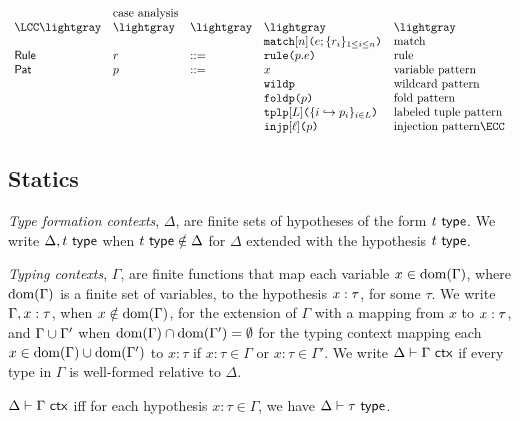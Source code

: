 \[\begin{array}{lllllll}
& \text{case analysis}\\
\LCC \lightgray & \lightgray & \lightgray 
& \lightgray & \lightgray \\
&&
& \aematchwith{n}{e}{\seqschemaX{r}}
& \text{match}\\
\mathsf{Rule} & r & ::= 
& \aematchrule{p}{e} 
& \text{rule}\\
\mathsf{Pat} & p & ::= 
& x  
& \text{variable pattern}\\
&&& \aewildp 
& \text{wildcard pattern}\\
&&& \aefoldp{p} 
& \text{fold pattern}\\
&&& \aetplp{\labelset}{\mapschema{p}{i}{\labelset}} 
& \text{labeled tuple pattern}\\
&&& \aeinjp{\ell}{p} 
& \text{injection pattern} \ECC
\end{array}\]

\subsection{Statics}
\emph{Type formation contexts}, $\Delta$, are finite sets of hypotheses of the form $t~\mathsf{type}$. We write $\Delta, t~\mathsf{type}$ when $t~\mathsf{type} \notin \Delta$ for $\Delta$ extended with the hypothesis $t~\mathsf{type}$. %

\emph{Typing contexts}, $\Gamma$, are finite functions that map each variable $x \in \text{dom}(\Gamma)$, where $\text{dom}(\Gamma)$ is a finite set of variables, to the hypothesis $x : \tau$, for some $\tau$. We write $\Gamma, x : \tau$, when $x \notin \text{dom}(\Gamma)$, for the extension of $\Gamma$ with a mapping from $x$ to $x : \tau$, and ${\Gamma}\cup{\Gamma'}$ when $\text{dom}(\Gamma) \cap \text{dom}(\Gamma') = \emptyset$ for the typing context mapping each $x \in \text{dom}(\Gamma) \cup \text{dom}(\Gamma')$ to $x : \tau$ if $x : \tau \in \Gamma$ or $x : \tau \in \Gamma'$. We write $\Delta \vdash \Gamma~\mathsf{ctx}$ if every type in $\Gamma$ is well-formed relative to $\Delta$.
\begin{definition} \label{def:isctxU}
$\Delta \vdash \Gamma~\mathsf{ctx}$ iff for each hypothesis $x : \tau \in \Gamma$, we have $\Delta \vdash \tau~\mathsf{type}$.
\end{definition}

